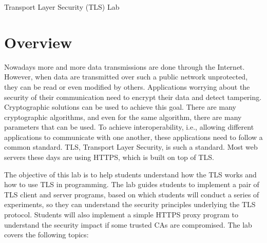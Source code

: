 

\newcommand{\commonfolder}{../../common-files}





\newcommand{\tlsFigs}{./Figs}


\newcommand{\hostu}{{\tt U}\xspace}
\newcommand{\hostv}{{\tt V}\xspace}




\begin{center}
{\LARGE Transport Layer Security (TLS) Lab}
\end{center}




\section{Overview}

Nowadays more and more data transmissions are done through the Internet. However, when data are
transmitted over such a public network unprotected, they can be
read or even modified by others. Applications worrying
about the security of their communication need to encrypt their data and
detect tampering. Cryptographic solutions can be used to achieve this goal.
There are many cryptographic algorithms, and even for the same
algorithm, there are many parameters that can be used. To achieve interoperability, i.e.,
allowing different applications to communicate with one another, these
applications need to follow a common standard. TLS, Transport Layer Security, is such a standard.
Most web servers these days are using HTTPS, which is built on top of TLS.

The objective of this lab is to help students understand how the TLS works and how 
to use TLS in programming. The lab
guides students to implement a pair of TLS client and server programs, based on
which students will conduct a series of experiments, so they can understand the 
security principles underlying the TLS protocol. Students will also
implement a simple HTTPS proxy program to understand the security 
impact if some trusted CAs are compromised. 
The lab covers the following topics:

